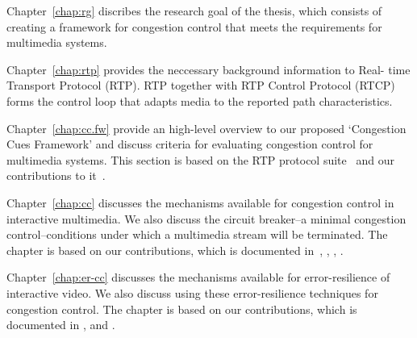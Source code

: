 Chapter~\ref{chap:rg} discribes the research goal of the thesis, which consists
of creating a framework for congestion control that meets the requirements for
multimedia systems.


Chapter~\ref{chap:rtp} provides the neccessary background information to Real-
time Transport Protocol (RTP). RTP together with RTP Control Protocol (RTCP)
forms the control loop that adapts media to the reported path characteristics.


Chapter~\ref{chap:cc.fw} provide an high-level overview to our proposed
`Congestion Cues Framework' and discuss criteria for evaluating congestion
control for multimedia systems. This section is based on the RTP protocol
suite~\cite{rfc3550, rfc4585, rfc3611, rfc5104, rfc5506} and our contributions
to it~\cite{draft.rmcat.evaluate, draft.xr.discard.rle, draft.xr.jb}.


Chapter~\ref{chap:cc} discusses the mechanisms available for congestion control
in interactive multimedia. We also discuss the circuit breaker--a minimal
congestion control--conditions under which a multimedia stream will be
terminated. The chapter is based on our contributions, which is documented
in~\cite{draft.rtp.cb, Singh:control.loops.api}, ,
, .


Chapter~\ref{chap:er-cc} discusses the mechanisms available for error-resilience of
interactive video. We also discuss using these error-resilience techniques for
congestion control. The chapter is based on our contributions, which is
documented in , and .



